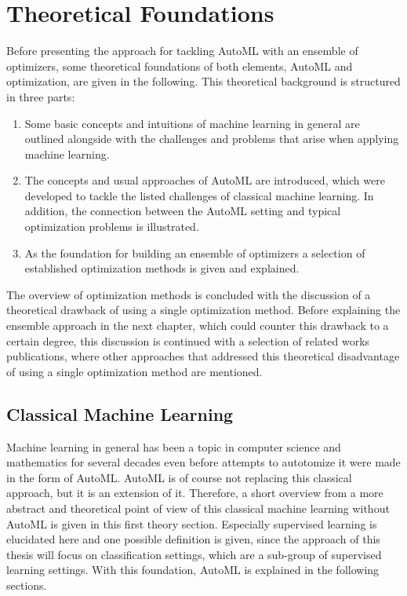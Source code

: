 %
\chapter{Theoretical Foundations}
\label{sec:theory}
Before presenting the approach for tackling AutoML with an ensemble of optimizers, some theoretical foundations of both elements, AutoML and optimization, are given in the following.
This theoretical background is structured in three parts:
\begin{enumerate}
    \item Some basic concepts and intuitions of machine learning in general are outlined alongside with the challenges and problems that arise when applying machine learning.
    \item The concepts and usual approaches of AutoML are introduced, which were developed to tackle the listed challenges of classical machine learning. In addition, the connection between the AutoML setting and typical optimization problems is illustrated.
    \item As the foundation for building an ensemble of optimizers a selection of established optimization methods is given and explained.
\end{enumerate}
The overview of optimization methods is concluded with the discussion of a theoretical drawback of using a single optimization method.
Before explaining the ensemble approach in the next chapter, which could counter this drawback to a certain degree, this discussion is continued with a selection of related works publications, where other approaches that addressed this theoretical disadvantage of using a single optimization method are mentioned. 

\section{Classical Machine Learning}
\label{sec:theory:ml}
Machine learning in general has been a topic in computer science and mathematics for several decades even before attempts to autotomize it were made in the form of AutoML.
AutoML is of course not replacing this classical approach, but it is an extension of it.
Therefore, a short overview from a more abstract and theoretical point of view of this classical machine learning without AutoML is given in this first theory section.
Especially supervised learning is elucidated here and one possible definition is given, since the approach of this thesis will focus on classification settings, which are a sub-group of supervised learning settings.
With this foundation, AutoML is explained in the following sections.

